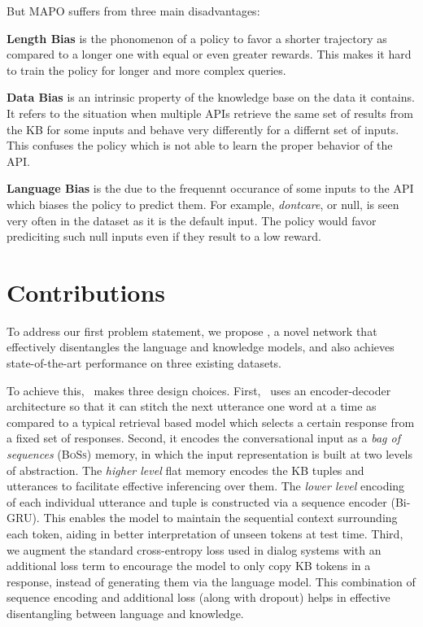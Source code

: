 But MAPO suffers from three main disadvantages:

\noindent\textbf{Length Bias} is the phonomenon of a policy to favor a shorter trajectory as compared to a longer one with equal or even greater rewards. This makes it hard to train the policy for longer and more complex queries.

\noindent\textbf{Data Bias} is an intrinsic property of the knowledge base on the data it contains. It refers to the situation when multiple APIs retrieve the same set of results from the KB for some inputs and behave very differently for a differnt set of inputs. This confuses the policy which is not able to learn the proper behavior of the API.

\noindent\textbf{Language Bias} is the due to the frequennt occurance of some inputs to the API which biases the policy to predict them. For example, {\em dontcare}, or null, is seen very often in the dataset as it is the default input. The policy would favor prediciting such null inputs even if they result to a low reward.

\section{Contributions}

To address our first problem statement, we propose \sys, a novel network that effectively disentangles the language and knowledge models, and also achieves state-of-the-art performance on three existing datasets. 

To achieve this, \sys\ makes three design choices. 
First, \sys\ uses an encoder-decoder architecture so that it can stitch the next utterance one word at a time as compared to a typical retrieval based model which selects a certain response from a fixed set of responses. 
Second, it encodes the conversational input as a {\em bag of sequences} (\textsc{BoSs}) memory, in which the input representation is built at two levels of abstraction. The \emph{higher level} flat memory encodes the KB tuples and utterances to facilitate effective inferencing over them. The \emph{lower level} encoding of each individual utterance and tuple is constructed via a sequence encoder (Bi-GRU). This enables the model to maintain the sequential context surrounding each token, aiding in better interpretation of unseen tokens at test time. 
Third, we augment the standard cross-entropy loss used in dialog systems with an additional loss term to encourage the model to only copy KB tokens in a response, instead of generating them via the language model. This combination of sequence encoding and additional loss (along with dropout) helps in effective disentangling between language and knowledge. 


